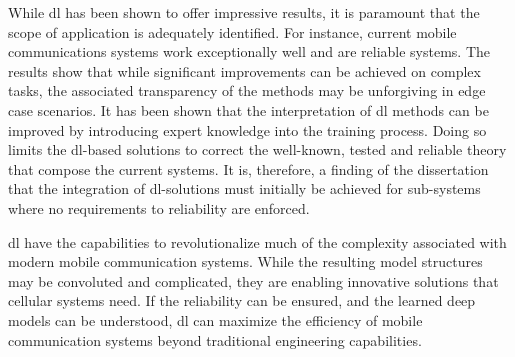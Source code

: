 While \acrlong{dl} has been shown to offer impressive results, it is paramount that the scope of application is adequately identified. For instance, current mobile communications systems work exceptionally well and are reliable systems. The results show that while significant improvements can be achieved on complex tasks, the associated transparency of the methods may be unforgiving in edge case scenarios. It has been shown that the interpretation of \acrlong{dl} methods can be improved by introducing expert knowledge into the training process. Doing so limits the \acrlong{dl}-based solutions to correct the well-known, tested and reliable theory that compose the current systems. It is, therefore, a finding of the dissertation that the integration of \acrlong{dl}-solutions must initially be achieved for sub-systems where no requirements to reliability are enforced. 

\acrlong{dl} have the capabilities to revolutionalize much of the complexity associated with modern mobile communication systems. While the resulting model structures may be convoluted and complicated, they are enabling innovative solutions that cellular systems need. If the reliability can be ensured, and the learned deep models can be understood, \acrlong{dl} can maximize the efficiency of mobile communication systems beyond traditional engineering capabilities.





